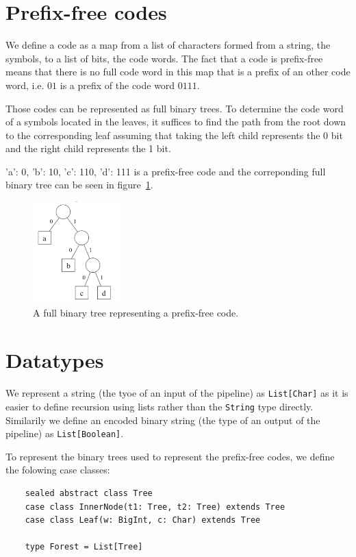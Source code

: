 \documentclass[a4paper,UKenglish,cleveref, autoref, thm-restate]{lipics-v2021}
\begin{document}
\section{Prefix-free codes}

We define a code as a map from a list of characters formed from a string, the symbols, to a list of bits, the code words. The fact that a code is prefix-free means that there is no full code word in this map that is a prefix of an other code word, i.e. $01$ is a prefix of the code word $0111$.

Those codes can be represented as full binary trees. To determine the code word of a symbols located in the leaves, it suffices to find the path from the root down to the corresponding leaf assuming that taking the left child represents the 0 bit and the right child represents the 1 bit.

{'a': 0, 'b': 10, 'c': 110, 'd': 111} is a prefix-free code and the correponding full binary tree can be seen in figure~\ref{fig:pfc}.
\begin{figure}[ht]
    \centering
    \includegraphics[width=0.3\textwidth]{pfc.png}
    \caption{A full binary tree representing a prefix-free code.\label{fig:pfc}}
\end{figure}

\section{Datatypes}

We represent a string (the tyoe of an input of the pipeline) as \lstinline{List[Char]} as it is easier to define recursion using lists rather than the \lstinline{String} type directly. 
Similarily we define an encoded binary string (the type of an output of the pipeline) as \lstinline{List[Boolean]}.

To represent the binary trees used to represent the prefix-free codes, we define the folowing case classes:

\begin{lstlisting}
    sealed abstract class Tree
    case class InnerNode(t1: Tree, t2: Tree) extends Tree
    case class Leaf(w: BigInt, c: Char) extends Tree
  
    type Forest = List[Tree]
\end{lstlisting}
\end{document}
